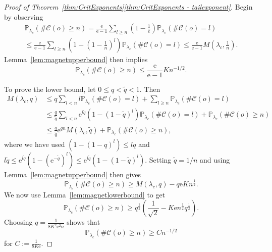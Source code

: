 \documentclass[10pt,a4paper,dvipsnames]{article}
\theoremstyle{definition}
\theoremstyle{remark}
\newcommand{\p}{\mathbb P}
\newcommand{\C}{\mathscr {C}}
\newcommand{\orig}{o}
\newcommand{\e}{\mathrm{e}}
\numberwithin{equation}{section}
\begin{document}
\begin{proof}[Proof of Theorem~\ref{thm:CritExponents}\ref{thm:CritExponents - tailexponent}]
Begin by observing
\begin{multline}
    \p_{\lambda_c} \left(\#\C\left(\orig\right) \geq n\right) =  \frac{\e}{\e-1} \sum_{l \geq n} \left(1- \tfrac 1e\right) \p_{\lambda_c} \left(\#\C\left(\orig\right) = l\right) \\\leq  \frac{\e}{\e-1} \sum_{l \geq n} \left(1- \left(1-\tfrac 1n\right)^l\right) \p_{\lambda_c} \left(\#\C\left(\orig\right) = l\right) \leq \frac{\e}{\e-1} M\left(\lambda_c,\tfrac 1n\right).
\end{multline}
Lemma~\ref{lem:magnetupperbound} then implies
\begin{equation}
    \p_{\lambda_c} \left(\#\C(\orig) \geq n\right) \leq \frac{\e}{\e-1}K n^{-1/2}.
\end{equation}

To prove the lower bound, let $0 \leq q < \tilde q < 1$. Then
\begin{align}
    M\left(\lambda_c,q\right) & \leq q \sum_{l < n} l \p_{\lambda_c} \left(\#\C\left(\orig\right) = l\right) + \sum_{l \geq n} \p_{\lambda_c} \left(\#\C\left(\orig\right) = l\right) \nonumber\\
	& \leq \frac{q}{\tilde q} \sum_{l < n} \e^{l \tilde q} \left(1-\left(1-\tilde q\right)^l\right) \p_{\lambda_c} \left(\#\C\left(\orig\right) = l\right) + \p_{\lambda_c} \left(\#\C\left(\orig\right) \geq n\right) \nonumber\\
		& \leq \frac{q}{\tilde q} \e^{\tilde q n} M(\lambda_c, \tilde{q}) + \p_{\lambda_c} \left(\#\C\left(\orig\right) \geq n\right),
\end{align}
where we have used $\left(1-\left(1-q\right)^l\right) \leq lq$ and $l \tilde q \leq \e^{l \tilde q} \left( 1- \left(\e^{- \tilde q}\right)^l\right) \leq \e^{l \tilde q} \left(1- \left(1-\tilde q\right)^l\right)$. Setting $\tilde q = 1/n$ and using Lemma~\ref{lem:magnetupperbound} then gives
\begin{equation}
    \p_{\lambda_c} \left(\#\C\left(\orig\right) \geq n\right) \geq M(\lambda_c,q) - q\e Kn^{\frac{1}{2}}.
\end{equation}
We now use Lemma~\ref{lem:magnetlowerbound} to get
\begin{equation}
    \p_{\lambda_c} \left(\#\C\left(\orig\right) \geq n\right) \geq q^{\frac{1}{2}} \left(\frac{1}{\sqrt{2}} - K\e n^{\frac{1}{2}}q^{\frac{1}{2}} \right).
\end{equation}
Choosing $q=\frac{1}{8K^2 \e^2 n}$ shows that
\begin{equation}
    \p_{\lambda_c} \left(\#\C\left(\orig\right) \geq n\right) \geq C n^{-1/2}
\end{equation}
for $C := \frac{1}{8K \e}$.
\end{proof}
\end{document}
